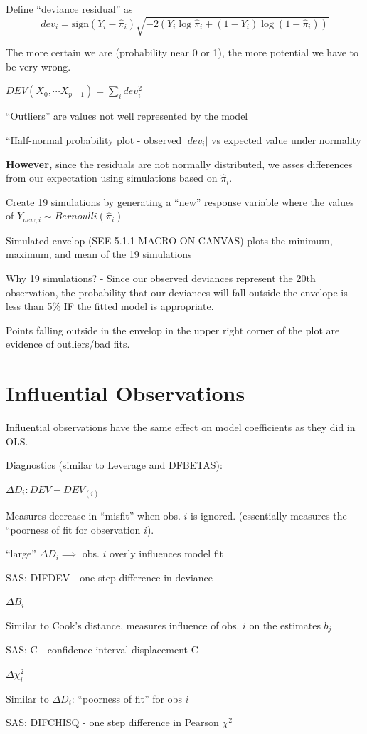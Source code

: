 \documentclass[12pt]{../notes}
\begin{document}
\bi
\item Define ``deviance residual'' as 
$$dev_i = \text{sign}(Y_i - \hat{\pi}_i)\sqrt{-2\left(Y_i\log\hat{\pi}_i + (1-Y_i)\log(1-\hat{\pi}_i)\right)}$$
\bi
\item The more certain we are (probability near 0 or 1), the more potential we have to be very wrong. 
\ei
\item $DEV(X_0, \cdots X_{p-1}) = \sum_i dev_i^2$
\item ``Outliers'' are values not well represented by the model
\item ``Half-normal probability plot - observed $|dev_i|$ vs expected value under normality
\bi
\item \textbf{However,} since the residuals are not normally distributed, we asses differences from our expectation using simulations based on $\hat{\pi}_i$. 
\bi
\item Create 19 simulations by generating a ``new'' response variable where the values of $Y_{new, i} \sim Bernoulli(\hat{\pi}_i)$
\ei
\item Simulated envelop (SEE 5.1.1 MACRO ON CANVAS) plots the minimum, maximum, and mean of the 19 simulations
\bi
\item Why 19 simulations? - Since our observed deviances represent the 20th observation, the probability that our deviances will fall outside the envelope is less than 5\% IF the fitted model is appropriate. 
\item Points falling outside in the envelop in the upper right corner of the plot are evidence of outliers/bad fits. 
\ei
\ei
\ei

\section{Influential Observations}
\nspace
Influential observations have the same effect on model coefficients as they did in OLS. 

\nspace
Diagnostics (similar to Leverage and DFBETAS):
\bi
\item $\Delta D_i: DEV - DEV_{(i)}$
\bi
\item Measures decrease in ``misfit'' when obs. $i$ is ignored. (essentially measures the ``poorness of fit for observation $i$). 
\item ``large'' $\Delta D_i \implies$ obs. $i$ overly influences model fit
\item SAS: DIFDEV - one step difference in deviance 
\ei
\item $\Delta B_i$
\bi
\item Similar to Cook's distance, measures influence of obs. $i$ on the estimates $b_j$
\item SAS: C - confidence interval displacement C
\ei
\item $\Delta \chi^2_i$
\bi
\item Similar to $\Delta D_i$: ``poorness of fit'' for obs $i$
\item SAS: DIFCHISQ - one step difference in Pearson $\chi^2$
\ei
\ei
\end{document}
